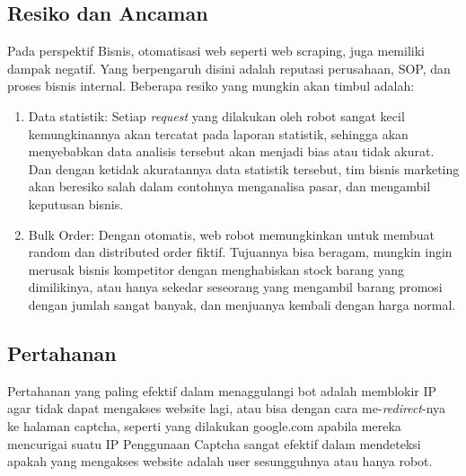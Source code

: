 \subsection{Resiko dan Ancaman}

Pada perspektif Bisnis, otomatisasi web seperti web scraping, juga memiliki dampak negatif. Yang berpengaruh disini adalah reputasi perusahaan, SOP, dan proses bisnis internal. Beberapa resiko yang mungkin akan timbul adalah:
\begin{enumerate}

\item Data statistik: Setiap \textit{request} yang dilakukan oleh robot sangat kecil kemungkinannya akan tercatat pada laporan statistik, sehingga akan menyebabkan data analisis tersebut akan menjadi bias atau tidak akurat. Dan dengan ketidak akuratannya data statistik tersebut, tim bisnis marketing akan beresiko salah dalam contohnya menganalisa pasar, dan mengambil keputusan bisnis.

\item Bulk Order: Dengan otomatis, web robot memungkinkan untuk membuat random dan distributed order fiktif. Tujuannya bisa beragam, mungkin ingin merusak bisnis kompetitor dengan menghabiskan stock barang yang dimilikinya, atau hanya sekedar seseorang yang mengambil barang promosi dengan jumlah sangat banyak, dan menjuanya kembali dengan harga normal.
\end{enumerate}

\subsection{Pertahanan}
Pertahanan yang paling efektif dalam menaggulangi bot adalah memblokir IP agar tidak dapat mengakses website lagi, atau bisa dengan cara me-\textit{redirect}-nya ke halaman captcha, seperti yang dilakukan google.com apabila mereka mencurigai suatu IP Penggunaan Captcha sangat efektif dalam mendeteksi apakah yang mengakses website adalah user sesungguhnya atau hanya robot.